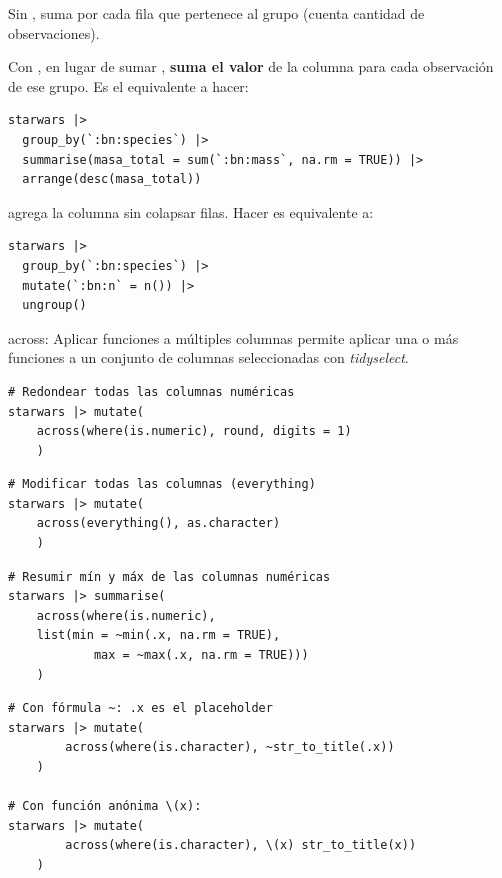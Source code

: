 \documentclass[8pt]{beamer}
\begin{document}
\begin{frame}[fragile]
	Sin ,  suma  por cada fila que pertenece al grupo (cuenta cantidad de observaciones).

	Con , en lugar de sumar , \textbf{suma el valor} de la columna  para cada observación de ese grupo. Es el equivalente a hacer:
	
\begin{lstlisting}[style=RScript]
starwars |>
  group_by(`:bn:species`) |>
  summarise(masa_total = sum(`:bn:mass`, na.rm = TRUE)) |>
  arrange(desc(masa_total))
\end{lstlisting}

 agrega la columna  sin colapsar filas. Hacer  es equivalente a:
\begin{lstlisting}[style=RScript]
starwars |>
  group_by(`:bn:species`) |>
  mutate(`:bn:n` = n()) |>
  ungroup()
\end{lstlisting}
\end{frame}







\begin{frame}[fragile]{across: Aplicar funciones a múltiples columnas}
	 permite aplicar una o más funciones a un conjunto de columnas seleccionadas con \emph{tidyselect}.
\begin{lstlisting}[style=RScript]
# Redondear todas las columnas numéricas
starwars |> mutate(
  	across(where(is.numeric), round, digits = 1)
	)
\end{lstlisting}
\begin{lstlisting}[style=RScript]
# Modificar todas las columnas (everything)
starwars |> mutate(
  	across(everything(), as.character)
	)
\end{lstlisting}
\begin{lstlisting}[style=RScript]
# Resumir mín y máx de las columnas numéricas
starwars |> summarise(
  	across(where(is.numeric),
   	list(min = ~min(.x, na.rm = TRUE),
        	max = ~max(.x, na.rm = TRUE)))
	)
\end{lstlisting}
\end{frame}





\begin{frame}[fragile]
\begin{lstlisting}[style=RScript]
# Con fórmula ~: .x es el placeholder
starwars |> mutate(
		across(where(is.character), ~str_to_title(.x))
	)

# Con función anónima \(x):
starwars |> mutate(
		across(where(is.character), \(x) str_to_title(x))
	)
\end{lstlisting}
\end{frame}
\end{document}
